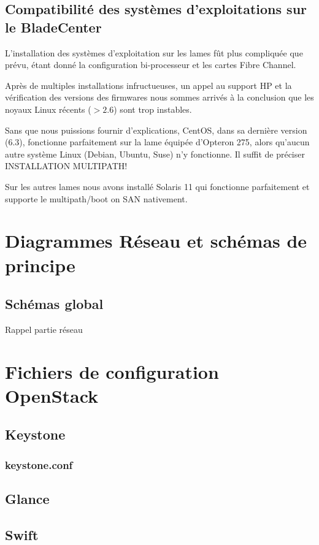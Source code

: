 \documentclass{report}
\begin{document}
\section{Compatibilité des systèmes d'exploitations sur le BladeCenter}
L'installation des systèmes d'exploitation sur les lames fût plus compliquée que prévu, étant donné la configuration bi-processeur et les cartes Fibre Channel.

Après de multiples installations infructueuses, un appel au support HP et la vérification des versions des firmwares nous sommes arrivés à la conclusion que les noyaux Linux récents ($ > 2.6 $) sont trop instables.

Sans que nous puissions fournir d'explications, CentOS, dans sa dernière version (6.3), fonctionne parfaitement sur la lame équipée d'Opteron 275, alors qu'aucun autre système Linux (Debian, Ubuntu, Suse) n'y fonctionne.
Il suffit de préciser INSTALLATION MULTIPATH!

Sur les autres lames nous avons installé Solaris 11 qui fonctionne parfaitement et supporte le multipath/boot on SAN nativement.

\appendix
\chapter{Diagrammes Réseau et schémas de principe}
\section{Schémas global}
Rappel partie réseau

\chapter{Fichiers de configuration OpenStack}
\section{Keystone}
\subsection{keystone.conf}

\section{Glance}

\section{Swift}
\end{document}
